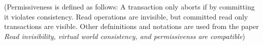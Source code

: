 % 
% 
% 
% 
% 

(Permissiveness is defined as follows: A transaction only aborts if by committing it violates consistency.
Read operations are invisible, but committed read only transactions are visible.
Other defninitions and notations are used from the paper \emph{Read invisibility, virtual world consistency, and permissivenss are compatible})

